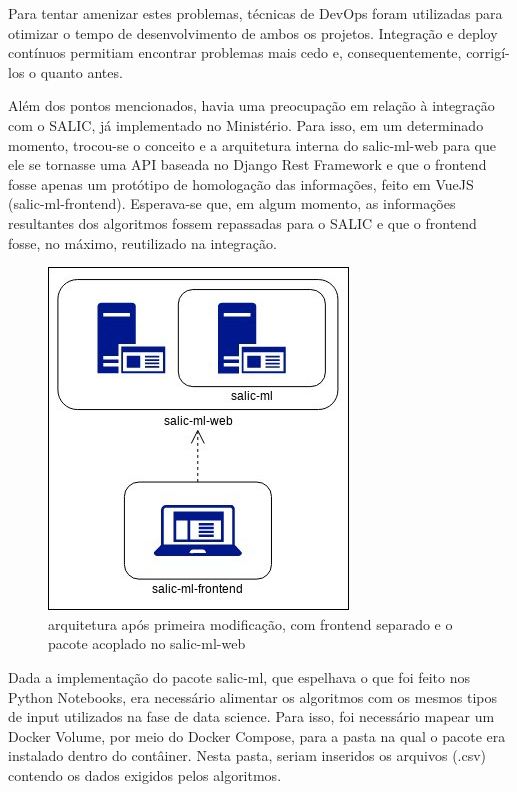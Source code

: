 Para tentar amenizar estes problemas, técnicas de DevOps foram
utilizadas para otimizar o tempo de desenvolvimento de ambos os
projetos. Integração e deploy contínuos permitiam encontrar problemas
mais cedo e, consequentemente, corrigí-los o quanto antes.

Além dos pontos mencionados, havia uma preocupação em relação à
integração com o SALIC, já implementado no Ministério. Para isso, em um
determinado momento, trocou-se o conceito e a arquitetura interna do
salic-ml-web para que ele se tornasse uma API baseada no Django Rest
Framework e que o frontend fosse apenas um protótipo de homologação das
informações, feito em VueJS (salic-ml-frontend). Esperava-se que, em
algum momento, as informações resultantes dos algoritmos fossem
repassadas para o SALIC e que o frontend fosse, no máximo, reutilizado
na integração.

\begin{figure}
\centering
\includegraphics{figs/salicml2.jpg}
\caption{arquitetura após primeira modificação, com frontend separado e
o pacote acoplado no salic-ml-web}
\end{figure}

Dada a implementação do pacote salic-ml, que espelhava o que foi feito
nos Python Notebooks, era necessário alimentar os algoritmos com os
mesmos tipos de input utilizados na fase de data science. Para isso, foi
necessário mapear um Docker Volume, por meio do Docker Compose, para a
pasta na qual o pacote era instalado dentro do contâiner. Nesta pasta,
seriam inseridos os arquivos (.csv) contendo os dados exigidos pelos
algoritmos.

